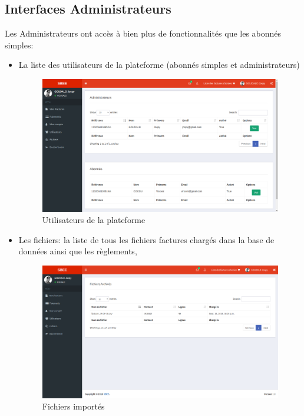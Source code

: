       \subsection{Interfaces Administrateurs}
	 Les Administrateurs ont acc\`es \`a bien plus de fonctionnalit\'es que les abonn\'es simples:
	  \begin{itemize}
	    \item La liste des utilisateurs de la plateforme (abonn\'es simples et administrateurs)
	       \begin{figure}[H]
		  \begin{center}
		      \includegraphics[scale=0.35]{images/gcv.png}
		  \end{center}
		  \caption{Utilisateurs de la plateforme}
		  \label{Page de la whitelist Port}
	      \end{figure}
	    
	    \item Les fichiers: la liste de tous les fichiers factures charg\'es dans la base de données ainsi que les r\`eglements,
	      \begin{figure}[H]
		  \begin{center}
		      \includegraphics[scale=0.35]{images/files.png}
		  \end{center}
		  \caption{Fichiers import\'es}
		  \label{Page de la whitelist Port}
	      \end{figure}
	      
	  \end{itemize}

